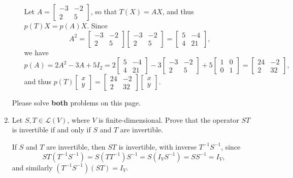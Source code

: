 \documentclass[12pt]{article}
\newcommand{\points}[1]{\marginpar{\hspace{24pt}[#1]}}
\begin{document}
\begin{enumerate}
\begin{enumerate}
Let $A=\begin{bmatrix}-3&-2\\2&5\end{bmatrix}$, so that $T(X)=AX$, and thus $p(T)X = p(A)X$. Since 
\[
 A^2 = \begin{bmatrix}-3&-2\\2&5\end{bmatrix}\begin{bmatrix}-3&-2\\2&5\end{bmatrix}=\begin{bmatrix}5&-4\\4&21\end{bmatrix},
\]
we have
\[
p(A) = 2A^2-3A+5I_2 = 2\begin{bmatrix}5&-4\\4&21\end{bmatrix}-3\begin{bmatrix}-3&-2\\2&5\end{bmatrix}+5\begin{bmatrix}1&0\\0&1\end{bmatrix}=\begin{bmatrix}24&-2\\2&32\end{bmatrix},
\]
and thus $p(T)\begin{bmatrix}x\\y\end{bmatrix}=\begin{bmatrix}24&-2\\2&32\end{bmatrix}\begin{bmatrix}x\\y\end{bmatrix}$.

\end{enumerate}
\newpage

Please solve {\bf both} problems on this page.

\bigskip

\item Let $S,T\in\mathcal{L}(V)$, where $V$ is finite-dimensional. Prove that the operator $ST$ is invertible if and only if $S$ and $T$ are invertible. \points{6}

\bigskip

If $S$ and $T$ are invertible, then $ST$ is invertible, with inverse $T^{-1}S^{-1}$, since
\[
 ST(T^{-1}S^{-1}) = S(TT^{-1})S^{-1}=S(I_VS^{-1})=SS^{-1}=I_V,
\]
and similarly $(T^{-1}S^{-1})(ST) = I_V$.


\end{enumerate}
\end{document}
